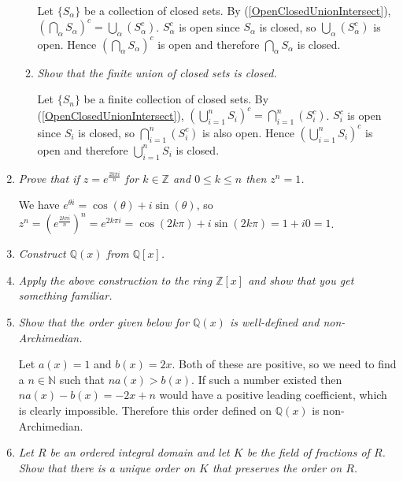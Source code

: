 \documentclass[11pt]{article}
\begin{document}
\begin{enumerate}
\begin{enumerate}
Let $\{S_\alpha\}$ be a collection of closed sets.  By (\ref{OpenClosedUnionIntersect}), $\left(\bigcap_\alpha S_\alpha \right)^c = \bigcup_\alpha \left(S_\alpha^c\right)$.  $S_\alpha^c$ is open since $S_\alpha$ is closed, so  $\bigcup_\alpha \left(S_\alpha^c\right)$ is open.  Hence $\left(\bigcap_\alpha S_\alpha \right)^c$ is open and therefore $\bigcap_\alpha S_\alpha$ is closed.

\item \emph{Show that the finite union of closed sets is closed.}

Let $\{S_n\}$ be a finite collection of closed sets.  By (\ref{OpenClosedUnionIntersect}), $\left(\bigcup_{i=1}^n S_i \right)^c = \bigcap_{i=1}^n \left(S_i^c\right)$.  $S_i^c$ is open since $S_i$ is closed, so $\bigcap_{i=1}^n \left(S_i^c\right)$ is also open.  Hence $\left(\bigcup_{i=1}^n S_i \right)^c$ is open and therefore $\bigcup_{i=1}^n S_i$ is closed.

\end{enumerate}

\item \emph{Prove that if $z = e^\frac{2k \pi i}{n}$ for $k \in \mathbb{Z}$ and $0 \leq k \leq n$ then $z^n = 1$.}

We have $e^{\theta i} = \cos(\theta) + i\sin(\theta)$, so $z^n = (e^\frac{2k \pi i}{n})^n = e^{2k \pi i} = \cos(2k \pi) + i\sin(2k \pi) = 1 + i0 = 1$.
\item \emph{Construct $\mathbb{Q}(x)$ from $\mathbb{Q}[x]$.}

\item \emph{Apply the above construction to the ring $\mathbb{Z}[x]$ and show that you get something familiar.}

\item \emph{Show that the order given below for $\mathbb{Q}(x)$ is well-defined and non-Archimedian.}

Let $a(x)=1$ and $b(x) = 2x$.  Both of these are positive, so we need to find a $n \in \mathbb{N}$ such that $na(x) > b(x)$.  If such a number existed then $na(x) - b(x) = -2x + n$ would have a positive leading coefficient, which is clearly impossible.  Therefore this order defined on $\mathbb{Q}(x)$ is non-Archimedian.

\item \emph{Let $R$ be an ordered integral domain and let $K$ be the field of fractions of $R$.  Show that there is a unique order on $K$ that preserves the order on $R$.}
\end{enumerate}
\end{document}
